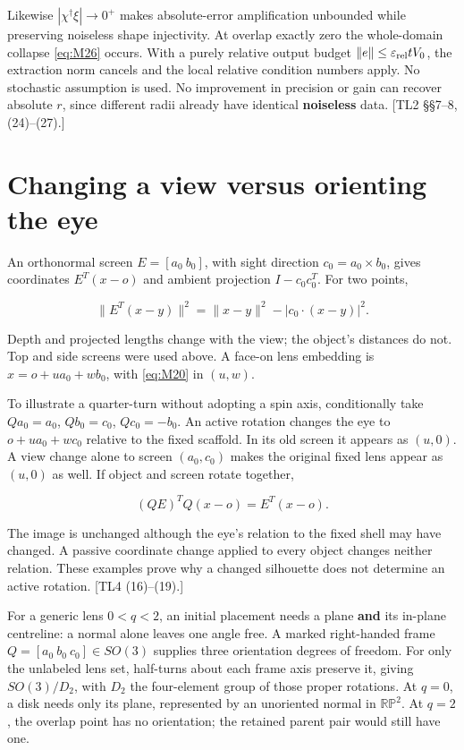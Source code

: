 \documentclass[11pt,a4paper]{article}
\begin{document}
Likewise \(|\chi^\dagger\xi|\to0^+\) makes absolute-error amplification unbounded while preserving noiseless shape injectivity. At overlap exactly zero the whole-domain collapse \eqref{eq:M26} occurs. With a purely relative output budget \(\|e\|\le\varepsilon_{\rm rel}tV_0\), the extraction norm cancels and the local relative condition numbers apply. No stochastic assumption is used. No improvement in precision or gain can recover absolute \(r\), since different radii already have identical \textbf{noiseless} data. [TL2 \S{}\S{}7--8, (24)--(27).]

\section{Changing a view versus orienting the eye}

An orthonormal screen \(E=[a_0\ b_0]\), with sight direction \(c_0=a_0\times b_0\), gives coordinates \(E^T(x-o)\) and ambient projection \(I-c_0c_0^T\). For two points,

\[
\|E^T(x-y)\|^2=\|x-y\|^2-|c_0\cdot(x-y)|^2.
\tag{M36}\label{eq:M36}
\]

Depth and projected lengths change with the view; the object's distances do not. Top and side screens were used above. A face-on lens embedding is \(x=o+ua_0+wb_0\), with \eqref{eq:M20} in \((u,w)\).

To illustrate a quarter-turn without adopting a spin axis, conditionally take \(Q a_0=a_0\), \(Q b_0=c_0\), \(Q c_0=-b_0\). An active rotation changes the eye to \(o+ua_0+wc_0\) relative to the fixed scaffold. In its old screen it appears as \((u,0)\). A view change alone to screen \((a_0,c_0)\) makes the original fixed lens appear as \((u,0)\) as well. If object and screen rotate together,

\[
(QE)^TQ(x-o)=E^T(x-o).
\tag{M37}\label{eq:M37}
\]

The image is unchanged although the eye's relation to the fixed shell may have changed. A passive coordinate change applied to every object changes neither relation. These examples prove why a changed silhouette does not determine an active rotation. [TL4 (16)--(19).]

For a generic lens \(0<q<2\), an initial placement needs a plane \textbf{and} its in-plane centreline: a normal alone leaves one angle free. A marked right-handed frame \(Q=[a_0\ b_0\ c_0]\in SO(3)\) supplies three orientation degrees of freedom. For only the unlabeled lens set, half-turns about each frame axis preserve it, giving \(SO(3)/D_2\), with \(D_2\) the four-element group of those proper rotations. At \(q=0\), a disk needs only its plane, represented by an unoriented normal in \(\mathbb{RP}^2\). At \(q=2\), the overlap point has no orientation; the retained parent pair would still have one.
\end{document}
